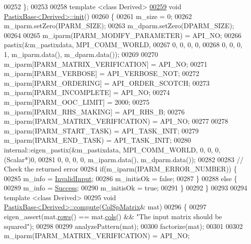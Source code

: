 \begin{DoxyCode}
00252 \}; 
00253 
00258 \textcolor{keyword}{template} <\textcolor{keyword}{class} Derived>
\hyperlink{class_eigen_1_1_pastix_base_ac6202714edd1943646e34f16ad384336}{00259} \textcolor{keywordtype}{void} \hyperlink{class_eigen_1_1_pastix_base_ac6202714edd1943646e34f16ad384336}{PastixBase<Derived>::init}()
00260 \{
00261   m\_size = 0; 
00262   m\_iparm.setZero(IPARM\_SIZE);
00263   m\_dparm.setZero(DPARM\_SIZE);
00264   
00265   m\_iparm(IPARM\_MODIFY\_PARAMETER) = API\_NO;
00266   pastix(&m\_pastixdata, MPI\_COMM\_WORLD,
00267          0, 0, 0, 0,
00268          0, 0, 0, 1, m\_iparm.data(), m\_dparm.data());
00269   
00270   m\_iparm[IPARM\_MATRIX\_VERIFICATION] = API\_NO;
00271   m\_iparm[IPARM\_VERBOSE]             = API\_VERBOSE\_NOT;
00272   m\_iparm[IPARM\_ORDERING]            = API\_ORDER\_SCOTCH;
00273   m\_iparm[IPARM\_INCOMPLETE]          = API\_NO;
00274   m\_iparm[IPARM\_OOC\_LIMIT]           = 2000;
00275   m\_iparm[IPARM\_RHS\_MAKING]          = API\_RHS\_B;
00276   m\_iparm(IPARM\_MATRIX\_VERIFICATION) = API\_NO;
00277   
00278   m\_iparm(IPARM\_START\_TASK) = API\_TASK\_INIT;
00279   m\_iparm(IPARM\_END\_TASK) = API\_TASK\_INIT;
00280   internal::eigen\_pastix(&m\_pastixdata, MPI\_COMM\_WORLD, 0, 0, 0, (Scalar*)0,
00281                          0, 0, 0, 0, m\_iparm.data(), m\_dparm.data());
00282   
00283   \textcolor{comment}{// Check the returned error}
00284   \textcolor{keywordflow}{if}(m\_iparm(IPARM\_ERROR\_NUMBER)) \{
00285     m\_info = \hyperlink{group__enums_gga85fad7b87587764e5cf6b513a9e0ee5ea945604f62795ffc70aedf2bd12ea0434}{InvalidInput};
00286     m\_initisOk = \textcolor{keyword}{false};
00287   \}
00288   \textcolor{keywordflow}{else} \{ 
00289     m\_info = \hyperlink{group__enums_gga85fad7b87587764e5cf6b513a9e0ee5ea52581b035f4b59c203b8ff999ef5fcea}{Success};
00290     m\_initisOk = \textcolor{keyword}{true};
00291   \}
00292 \}
00293 
00294 \textcolor{keyword}{template} <\textcolor{keyword}{class} Derived>
00295 \textcolor{keywordtype}{void} \hyperlink{class_eigen_1_1_pastix_base}{PastixBase<Derived>::compute}(\hyperlink{group___sparse_core___module}{ColSpMatrix}& mat)
00296 \{
00297   eigen\_assert(mat.\hyperlink{group___sparse_core___module_a62e61bb861eee306d5b069ce652b5aa5}{rows}() == mat.\hyperlink{group___sparse_core___module_aa391750e3c530227e4a5c3c52e959975}{cols}() && \textcolor{stringliteral}{"The input matrix should be squared"});
00298   
00299   analyzePattern(mat);  
00300   factorize(mat);
00301   
00302   m\_iparm(IPARM\_MATRIX\_VERIFICATION) = API\_NO;

\end{DoxyCode}
